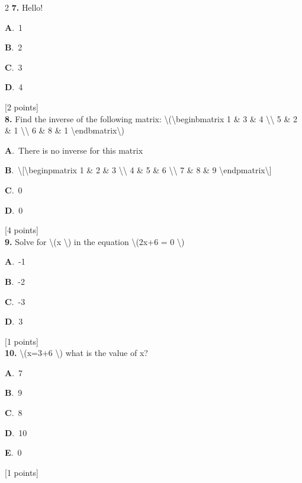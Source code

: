 \documentclass[12pt]{article}
\newcommand{\choice}[3]{%
  \noindent\textbf{#1}.~#2\hfill#3\par\vspace{0.25em}
}
\begin{document}
\begin{multicols}{2}
\noindent \textbf{\textenglish{7.}} {\textenglish{Hello!}}

\noindent\choice{A}{{\textenglish{1}}}{}
\noindent\choice{B}{{\textenglish{2}}}{}
\noindent\choice{C}{{\textenglish{3}}}{}
\noindent\choice{D}{{\textenglish{4}}}{}
\hfill {\textenglish{[2 points]}}\\[0.5em]

\noindent \textbf{\textenglish{8.}} {\textenglish{Find the inverse of the following matrix: \textbackslash{}(\textbackslash{}begin{bmatrix} 1 \& 3 \& 4 \textbackslash{}\textbackslash{} 5 \& 2 \& 1 \textbackslash{}\textbackslash{} 6 \& 8 \& 1 \textbackslash{}end{bmatrix}\textbackslash{})}}

\noindent\choice{A}{{\textenglish{There is no inverse for this matrix}}}{}
\noindent\choice{B}{{\textenglish{\textbackslash{}[\textbackslash{}begin{pmatrix} 1 \& 2 \& 3 \textbackslash{}\textbackslash{} 4 \& 5 \& 6 \textbackslash{}\textbackslash{} 7 \& 8 \& 9  \textbackslash{}end{pmatrix}\textbackslash{}]}}}{}
\noindent\choice{C}{{\textenglish{0}}}{}
\noindent\choice{D}{{\textenglish{0}}}{}
\hfill {\textenglish{[4 points]}}\\[0.5em]

\noindent \textbf{\textenglish{9.}} {\textenglish{Solve for \textbackslash{}(x \textbackslash{}) in the equation \textbackslash{}(2x+6 = 0 \textbackslash{})}}

\noindent\choice{A}{{\textenglish{-1}}}{}
\noindent\choice{B}{{\textenglish{-2}}}{}
\noindent\choice{C}{{\textenglish{-3}}}{}
\noindent\choice{D}{{\textenglish{3}}}{}
\hfill {\textenglish{[1 points]}}\\[0.5em]

\noindent \textbf{\textenglish{10.}} {\textenglish{\textbackslash{}(x=3+6 \textbackslash{}) what is the value of x?}}

\noindent\choice{A}{{\textenglish{7}}}{}
\noindent\choice{B}{{\textenglish{9}}}{}
\noindent\choice{C}{{\textenglish{8}}}{}
\noindent\choice{D}{{\textenglish{10}}}{}
\noindent\choice{E}{{\textenglish{0}}}{}
\hfill {\textenglish{[1 points]}}\\[0.5em]


\end{multicols}
\end{document}
